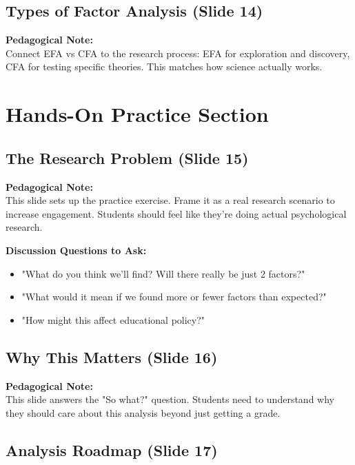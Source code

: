 \documentclass[11pt,a4paper]{article}
\newenvironment{pedagogicalnote}{%
  \begin{framed}
  \noindent\textbf{Pedagogical Note:}\\
}{\end{framed}}
\begin{document}
\subsection{Types of Factor Analysis (Slide 14)}

\begin{pedagogicalnote}
Connect EFA vs CFA to the research process: EFA for exploration and discovery, CFA for testing specific theories. This matches how science actually works.
\end{pedagogicalnote}

\section{Hands-On Practice Section}

\subsection{The Research Problem (Slide 15)}

\begin{pedagogicalnote}
This slide sets up the practice exercise. Frame it as a real research scenario to increase engagement. Students should feel like they're doing actual psychological research.
\end{pedagogicalnote}

\textbf{Discussion Questions to Ask:}
\begin{itemize}
    \item "What do you think we'll find? Will there really be just 2 factors?"
    \item "What would it mean if we found more or fewer factors than expected?"
    \item "How might this affect educational policy?"
\end{itemize}

\subsection{Why This Matters (Slide 16)}

\begin{pedagogicalnote}
This slide answers the "So what?" question. Students need to understand why they should care about this analysis beyond just getting a grade.
\end{pedagogicalnote}

\subsection{Analysis Roadmap (Slide 17)}
\end{document}
